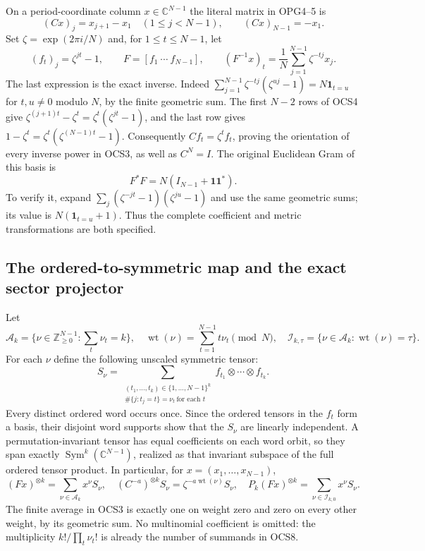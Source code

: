 \documentclass[11pt,a4paper]{article}
\begin{document}
On a period-coordinate column $x\in\mathbb C^{N-1}$ the literal
matrix in OPG4--5 is
\[
 (Cx)_j=x_{j+1}-x_1\quad(1\leq j<N-1),\qquad
 (Cx)_{N-1}=-x_1.
 \tag{OCS4}
\]
Set $\zeta=\exp(2\pi i/N)$ and, for $1\leq t\leq N-1$, let
\[
 (f_t)_j=\zeta^{jt}-1,\qquad
 F=[f_1\ \cdots\ f_{N-1}],\qquad
 (F^{-1}x)_t=\frac1N\sum_{j=1}^{N-1}\zeta^{-tj}x_j.
 \tag{OCS5}
\]
The last expression is the exact inverse. Indeed
$\sum_{j=1}^{N-1}\zeta^{-tj}(\zeta^{uj}-1)=N\mathbf1_{t=u}$
for $t,u\ne0$ modulo $N$, by the finite geometric sum.
The first $N-2$ rows of OCS4 give
$\zeta^{(j+1)t}-\zeta^t=\zeta^t(\zeta^{jt}-1)$, and the
last row gives $1-\zeta^t=\zeta^t(\zeta^{(N-1)t}-1)$.
Consequently $Cf_t=\zeta^tf_t$, proving the orientation of
every inverse power in OCS3, as well as $C^N=I$.
The original Euclidean Gram of this basis is
\[
 F^*F=N(I_{N-1}+\mathbf1\mathbf1^*).
 \tag{OCS6}
\]
To verify it, expand
$\sum_j(\zeta^{-jt}-1)(\zeta^{ju}-1)$ and use the same
geometric sums; its value is $N(\mathbf1_{t=u}+1)$.
Thus the complete coefficient and metric transformations are
both specified.

\subsection{The ordered-to-symmetric map and the exact sector projector}
Let
\[
 \mathcal A_k=\{\nu\in\mathbb Z_{\geq0}^{N-1}:\sum_t\nu_t=k\},
 \quad\operatorname{wt}(\nu)=\sum_{t=1}^{N-1}t\nu_t\pmod N,
 \quad\mathcal I_{k,\tau}=\{\nu\in\mathcal A_k:
                                      \operatorname{wt}(\nu)=\tau\}.
 \tag{OCS7}
\]
For each $\nu$ define the following unscaled symmetric tensor:
\[
 S_\nu=\sum_{\substack{(t_1,\ldots,t_k)\in\{1,\ldots,N-1\}^k\\
                   \#\{j:t_j=t\}=\nu_t\ \text{for each }t}}
                    f_{t_1}\otimes\cdots\otimes f_{t_k}.
 \tag{OCS8}
\]
Every distinct ordered word occurs once. Since the ordered tensors
in the $f_t$ form a basis, their disjoint word supports show that
the $S_\nu$ are linearly independent. A permutation-invariant tensor
has equal coefficients on each word orbit, so they span exactly
$\operatorname{Sym}^k(\mathbb C^{N-1})$, realized as that invariant
subspace of the full ordered tensor product. In particular, for
$x=(x_1,\ldots,x_{N-1})$,
\[
 (Fx)^{\otimes k}=\sum_{\nu\in\mathcal A_k}x^\nu S_\nu,
 \quad
 (C^{-a})^{\otimes k}S_\nu=
                         \zeta^{-a\operatorname{wt}(\nu)}S_\nu,
 \quad
 P_k(Fx)^{\otimes k}=\sum_{\nu\in\mathcal I_{k,0}}x^\nu S_\nu.
 \tag{OCS9}
\]
The finite average in OCS3 is exactly one on weight zero and
zero on every other weight, by its geometric sum. No multinomial
coefficient is omitted: the multiplicity $k!/\prod_t\nu_t!$
is already the number of summands in OCS8.
\end{document}
